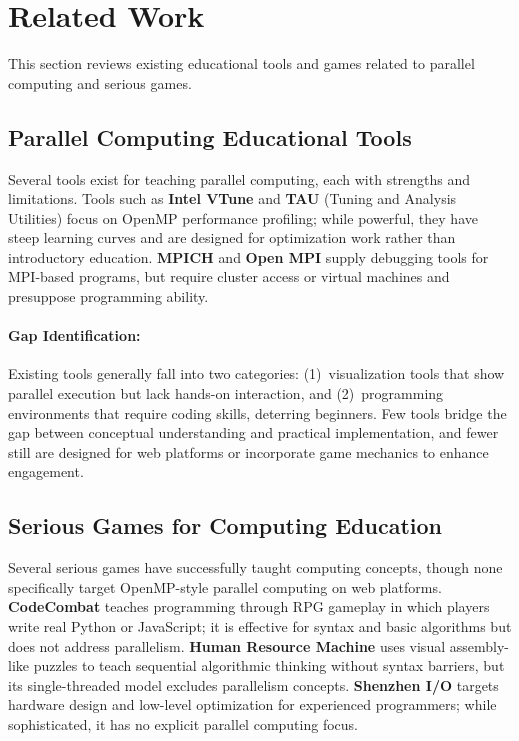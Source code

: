 \section{Related Work}
\label{sec:related-work}

This section reviews existing educational tools and games related to parallel computing and serious games.

\subsection{Parallel Computing Educational Tools}
\label{subsec:parallel-tools}

Several tools exist for teaching parallel computing, each with strengths and limitations.
Tools such as \textbf{Intel VTune} \citep{intel_vtune} and \textbf{TAU} (Tuning and Analysis Utilities) \citep{tau_shende2006} focus on OpenMP performance profiling; while powerful, they have steep learning curves and are designed for optimization work rather than introductory education.
\textbf{MPICH} \citep{mpich_website} and \textbf{Open MPI} \citep{openmpi_website} supply debugging tools for MPI-based programs, but require cluster access or virtual machines and presuppose programming ability.

\paragraph*{Gap Identification:}

Existing tools generally fall into two categories: (1)~visualization tools that show parallel execution but lack hands-on interaction, and (2)~programming environments that require coding skills, deterring beginners. Few tools bridge the gap between conceptual understanding and practical implementation, and fewer still are designed for web platforms or incorporate game mechanics to enhance engagement.

\subsection{Serious Games for Computing Education}
\label{subsec:cs-games}

Several serious games have successfully taught computing concepts, though none specifically target OpenMP-style parallel computing on web platforms.
\textbf{CodeCombat} \citep{codecombat} teaches programming through RPG gameplay in which players write real Python or JavaScript; it is effective for syntax and basic algorithms but does not address parallelism.
\textbf{Human Resource Machine} \citep{human_resource_machine} uses visual assembly-like puzzles to teach sequential algorithmic thinking without syntax barriers, but its single-threaded model excludes parallelism concepts.
\textbf{Shenzhen I/O} \citep{shenzhen_io} targets hardware design and low-level optimization for experienced programmers; while sophisticated, it has no explicit parallel computing focus.

